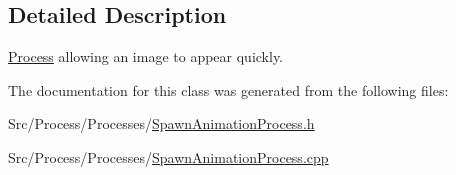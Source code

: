 \subsection{Detailed Description}
\hyperlink{classProcess}{Process} allowing an image to appear quickly. 

The documentation for this class was generated from the following files\-:\begin{DoxyCompactItemize}
\item 
Src/\-Process/\-Processes/\hyperlink{SpawnAnimationProcess_8h}{Spawn\-Animation\-Process.\-h}\item 
Src/\-Process/\-Processes/\hyperlink{SpawnAnimationProcess_8cpp}{Spawn\-Animation\-Process.\-cpp}\end{DoxyCompactItemize}
